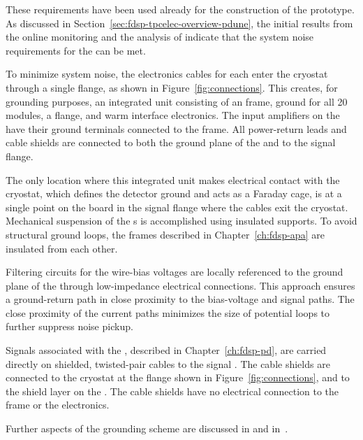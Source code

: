 These requirements have been used already for the construction
of the  prototype. As discussed in Section~\ref{sec:fdsp-tpcelec-overview-pdune},
the initial results from the online monitoring and the
analysis of  indicate that the system
noise requirements for the  
can be met.

To minimize system noise, the  electronics cables for each  
enter the cryostat through a single  flange, as shown in 
Figure~\ref{fig:connections}. This creates, for grounding purposes, 
an integrated unit consisting of an  frame, 
ground for all \num{20}  modules, a  flange, and 
warm interface electronics. The input amplifiers on the 
  have their ground terminals connected to 
the  frame. All power-return leads and cable shields are 
connected to both the ground plane of the  and to the 
 signal flange.

The only location where this integrated unit makes electrical contact 
with the cryostat, which defines the detector ground and acts as a 
Faraday cage, is at a single point on the  \fdth board in 
the  signal flange where the cables exit the cryostat. 
Mechanical suspension of the s is accomplished using 
insulated supports. To avoid structural ground loops, the  
frames described in Chapter~\ref{ch:fdsp-apa} are insulated from 
each other.

Filtering circuits for the  wire-bias voltages are 
locally referenced to the ground plane of the  
through low-impedance electrical connections. This approach 
ensures a ground-return path in close proximity to the 
bias-voltage and signal paths. The close proximity of the 
current paths minimizes the size of potential loops to further 
suppress noise pickup.

Signals associated with the , described in 
Chapter~\ref{ch:fdsp-pd}, are carried directly on shielded, 
twisted-pair cables to the signal \fdth. The cable shields 
are connected to the cryostat at the  flange 
shown in Figure~\ref{fig:connections}, and to the  
shield layer on the . The cable shields have no 
electrical connection to the  frame or the 
electronics.

Further aspects of the  grounding scheme are 
discussed in \tcchfac and in~\cite{DUNE:GroundingRules}.

